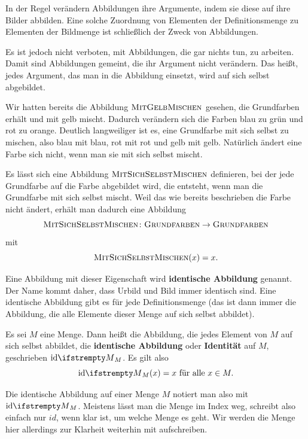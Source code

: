 \documentclass[../../main.tex]{subfiles}
\begin{document}
In der Regel verändern Abbildungen ihre Argumente, indem sie diese auf ihre Bilder abbilden. Eine solche Zuordnung von Elementen der Definitionsmenge zu Elementen der Bildmenge ist schließlich der Zweck von Abbildungen. 

Es ist jedoch nicht verboten, mit Abbildungen, die gar nichts tun, zu arbeiten. Damit sind Abbildungen gemeint, die ihr Argument nicht verändern. Das heißt, jedes Argument, das man in die Abbildung einsetzt, wird auf sich selbst abgebildet.

\begin{example}
    \parpic[r]{}
    Wir hatten bereits die Abbildung $\textsc{MitGelbMischen}$ gesehen, die Grundfarben erhält und mit gelb mischt. Dadurch verändern sich die Farben blau zu grün und rot zu orange. Deutlich langweiliger ist es, eine Grundfarbe mit sich selbst zu mischen, also blau mit blau, rot mit rot und gelb mit gelb. Natürlich ändert eine Farbe sich nicht, wenn man sie mit sich selbst mischt.
    
    Es lässt sich eine Abbildung $\textsc{MitSichSelbstMischen}$ definieren, bei der jede Grundfarbe auf die Farbe abgebildet wird, die entsteht, wenn man die Grundfarbe mit sich selbst mischt. Weil das wie bereits beschrieben die Farbe nicht ändert, erhält man dadurch eine Abbildung
    \[\textsc{MitSichSelbstMischen}\colon\textsc{Grundfarben}\rightarrow\textsc{Grundfarben}\]
    mit
    \[\textsc{MitSichSelbstMischen}(x)=x.\]
\end{example}

Eine Abbildung mit dieser Eigenschaft wird \textbf{identische Abbildung} genannt. Der Name kommt daher, dass Urbild und Bild immer identisch sind. Eine identische Abbildung gibt es für jede Definitionsmenge (das ist dann immer die Abbildung, die alle Elemente dieser Menge auf sich selbst abbildet).

\begin{definition}
    Es sei $M$ eine Menge. Dann heißt die Abbildung, die jedes Element von $M$ auf sich selbst abbildet, die \textbf{identische Abbildung} oder \textbf{Identität} auf $M$, geschrieben $\ident[M]$. Es gilt also \[\ident[M](x)=x\text{~für alle~}x\in M.\]
\end{definition}

Die identische Abbildung auf einer Menge $M$ notiert man also mit $\ident[M]$. Meistens lässt man die Menge im Index weg, schreibt also einfach nur $id$, wenn klar ist, um welche Menge es geht. Wir werden die Menge hier allerdings zur Klarheit weiterhin mit aufschreiben.
\end{document}
